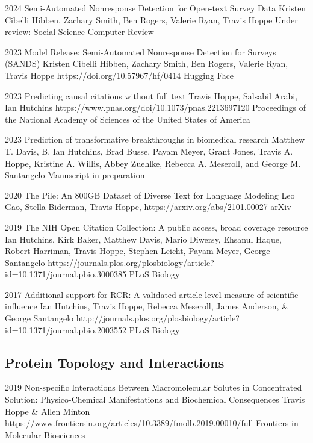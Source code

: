 \documentclass[]{scrartcl}
\begin{document}
\begin{cleanCV}
\Paper
{2024}
{Semi-Automated Nonresponse Detection for Open-text Survey Data}
{Kristen Cibelli Hibben, Zachary Smith, Ben Rogers, Valerie Ryan, Travis Hoppe}
{}
{Under review: Social Science Computer Review}


\Paper
{2023}
{Model Release: Semi-Automated Nonresponse Detection for Surveys (SANDS)}
{Kristen Cibelli Hibben, Zachary Smith, Ben Rogers, Valerie Ryan, Travis Hoppe}
{https://doi.org/10.57967/hf/0414}
{Hugging Face}

\Paper
{2023}
{Predicting causal citations without full text}
{Travis Hoppe, Salsabil Arabi, Ian Hutchins}
{https://www.pnas.org/doi/10.1073/pnas.2213697120}
{Proceedings of the National Academy of Sciences of the United States of America}

\Paper
{2023}
{Prediction of transformative breakthroughs in biomedical research}
{Matthew T. Davis, B. Ian Hutchins, Brad Busse, Payam Meyer, Grant Jones, Travis A. Hoppe, Kristine A. Willis, Abbey Zuehlke, Rebecca A. Meseroll, and George M. Santangelo}
{}{Manuscript in preparation}


\Paper
{2020}
{The Pile: An 800GB Dataset of Diverse Text for Language Modeling}
{Leo Gao, Stella Biderman, Travis Hoppe, \etal}
{https://arxiv.org/abs/2101.00027}
{arXiv}

\Paper
{2019}
{The NIH Open Citation Collection: A public access, broad coverage resource}
{Ian Hutchins, Kirk Baker, Matthew Davis, Mario Diwersy, Ehsanul Haque, Robert Harriman, Travis Hoppe, Stephen Leicht, Payam Meyer, George Santangelo}
{https://journals.plos.org/plosbiology/article?id=10.1371/journal.pbio.3000385}
{PLoS Biology}


\Paper
{2017}
{Additional support for RCR: A validated article-level measure of scientific influence}
{Ian Hutchins, Travis Hoppe, Rebecca Meseroll, James Anderson, \& George Santangelo}
{http://journals.plos.org/plosbiology/article?id=10.1371/journal.pbio.2003552}
{PLoS Biology}


\subsection{Protein Topology and Interactions}

\Paper
{2019}
{Non-specific Interactions Between Macromolecular Solutes in Concentrated Solution: Physico-Chemical Manifestations and Biochemical Consequences}
{Travis Hoppe \& Allen Minton}
{https://www.frontiersin.org/articles/10.3389/fmolb.2019.00010/full}
{Frontiers in Molecular Biosciences}



\end{cleanCV}
\end{document}
